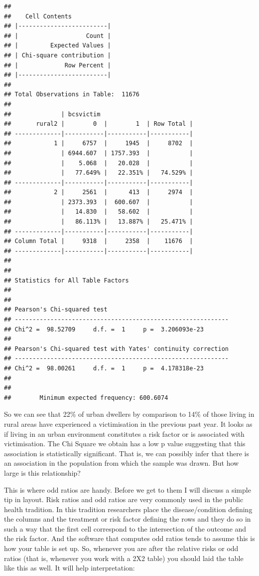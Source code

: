 \documentclass[
]{book}
\begin{document}
\begin{verbatim}
## 
##    Cell Contents
## |-------------------------|
## |                   Count |
## |         Expected Values |
## | Chi-square contribution |
## |             Row Percent |
## |-------------------------|
## 
## Total Observations in Table:  11676 
## 
##              | bcsvictim 
##       rural2 |        0  |        1  | Row Total | 
## -------------|-----------|-----------|-----------|
##            1 |     6757  |     1945  |     8702  | 
##              | 6944.607  | 1757.393  |           | 
##              |    5.068  |   20.028  |           | 
##              |   77.649% |   22.351% |   74.529% | 
## -------------|-----------|-----------|-----------|
##            2 |     2561  |      413  |     2974  | 
##              | 2373.393  |  600.607  |           | 
##              |   14.830  |   58.602  |           | 
##              |   86.113% |   13.887% |   25.471% | 
## -------------|-----------|-----------|-----------|
## Column Total |     9318  |     2358  |    11676  | 
## -------------|-----------|-----------|-----------|
## 
##  
## Statistics for All Table Factors
## 
## 
## Pearson's Chi-squared test 
## ------------------------------------------------------------
## Chi^2 =  98.52709     d.f. =  1     p =  3.206093e-23 
## 
## Pearson's Chi-squared test with Yates' continuity correction 
## ------------------------------------------------------------
## Chi^2 =  98.00261     d.f. =  1     p =  4.178318e-23 
## 
##  
##        Minimum expected frequency: 600.6074
\end{verbatim}

So we can see that 22\% of urban dwellers by comparison to 14\% of those living in rural areas have experienced a victimisation in the previous past year. It looks as if living in an urban environment constitutes a risk factor or is associated with victimisation. The Chi Square we obtain has a low p value suggesting that this association is statistically significant. That is, we can possibly infer that there is an association in the population from which the sample was drawn. But how large is this relationship?

This is where odd ratios are handy. Before we get to them I will discuss a simple tip in layout. Risk ratios and odd ratios are very commonly used in the public health tradition. In this tradition researchers place the disease/condition defining the columns and the treatment or risk factor defining the rows and they do so in such a way that the first cell correspond to the intersection of the outcome and the risk factor. And the software that computes odd ratios tends to assume this is how your table is set up. So, whenever you are after the relative risks or odd ratios (that is, whenever you work with a 2X2 table) you should laid the table like this as well. It will help interpretation:
\end{document}
